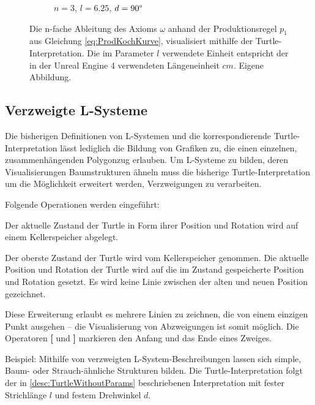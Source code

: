 \begin{figure} [hbtp]
\begin{subfigure}[t]{.3\textwidth}
		\caption{$n=3$, $l=6.25$, $d=90\degree$}
		\label{fig:KochkurveN3L6_25}
	\end{subfigure}
	\caption{Die n-fache Ableitung des Axioms $\omega$ anhand der Produktionsregel $p_1$ aus Gleichung \ref{eq:ProdKochKurve}, visualisiert mithilfe der Turtle-Interpretation. Die im Parameter $l$ verwendete Einheit entspricht der in der Unreal Engine 4 verwendeten Längeneinheit $cm$. Eigene Abbildung.}
	\label{fig:KochkurveAbleitung}
\end{figure}

\subsection{Verzweigte L-Systeme}

Die bisherigen Definitionen von L-Systemen und die korrespondierende Turtle-Interpretation lässt lediglich die Bildung von Grafiken zu, die einen einzelnen, zusammenhängenden Polygonzug erlauben. Um L-Systeme zu bilden, deren Visualisierungen Baumstrukturen ähneln muss die bisherige Turtle-Interpretation um die Möglichkeit erweitert werden, Verzweigungen zu verarbeiten. \cite[S.24]{ABOP:04} 

Folgende Operationen werden eingeführt:

\begin{description}[labelindent]
	\item[\textbf{[}] Der aktuelle Zustand der Turtle in Form ihrer Position und Rotation wird auf einem Kellerspeicher abgelegt. \\
	
	\item[\textbf{]}] Der oberste Zustand der Turtle wird vom Kellerspeicher genommen. Die aktuelle Position und Rotation der Turtle wird auf die im Zustand gespeicherte Position und Rotation gesetzt. Es wird keine Linie zwischen der alten und neuen Position gezeichnet.
\end{description}
	\cite[S.24]{ABOP:04} 

Diese Erweiterung erlaubt es mehrere Linien zu zeichnen, die von einem einzigen Punkt ausgehen -- die Visualisierung von Abzweigungen ist somit möglich. Die Operatoren \textbf{[} und \textbf{]} markieren den Anfang und das Ende eines Zweiges.

Beispiel: Mithilfe von verzweigten L-System-Beschreibungen lassen sich simple, Baum- oder Strauch-ähnliche Strukturen bilden. Die Turtle-Interpretation folgt der in \ref{desc:TurtleWithoutParams} beschriebenen Interpretation mit fester Strichlänge $l$ und festem Drehwinkel $d$.


